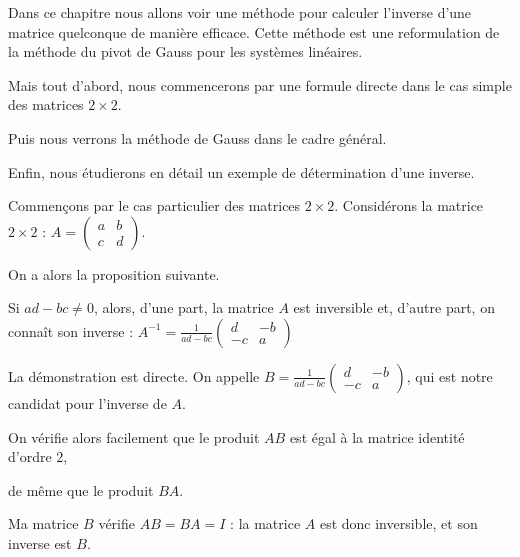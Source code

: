 







\debuttexte


\diapo

\change
Dans ce chapitre nous allons voir une méthode pour calculer l'inverse 
d'une matrice quelconque de manière efficace. 
Cette méthode est une reformulation de la méthode du pivot de Gauss pour les systèmes linéaires.

\change
Mais tout d'abord, nous commencerons par une formule directe dans le cas simple des matrices $2\times 2$.

\change
Puis nous verrons la méthode de Gauss dans le cadre général.

\change
Enfin, nous étudierons en détail un exemple de détermination d'une inverse.


\diapo
Commençons par le cas particulier des matrices $2\times 2$. Considérons la matrice $2\times 2$ :
$A = \begin{pmatrix}
 a & b\\
 c & d       
     \end{pmatrix}.
$ 

\change
On a alors la proposition suivante.

Si $ad - bc \not= 0$,  alors, d'une part, la matrice $A$ est inversible et, d'autre part, on connaît son inverse :
$A^{-1} = \frac{1}{ad-bc} \begin{pmatrix}
d & -b\\
 -c & a
\end{pmatrix}$
 
\change
La démonstration est directe. 
On appelle $B=\frac{1}{ad-bc}  \left(\begin{smallmatrix}
d & -b\\
 -c & a
\end{smallmatrix}\right)$, qui est notre candidat pour l'inverse de $A$. 

\change 
On vérifie alors facilement que le produit $AB$ est égal à la matrice identité d'ordre $2$,

\change
de même que le produit $BA$. 

Ma matrice $B$ vérifie $AB=BA=I$ : la matrice $A$ est donc inversible, et son inverse est $B$.

